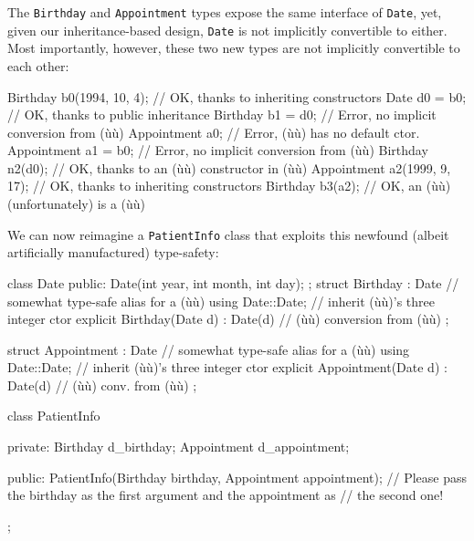 \noindent The \lstinline!Birthday! and \lstinline!Appointment! types expose the same
interface of \lstinline!Date!, yet, given our inheritance-based design,
\lstinline!Date! is not implicitly convertible to either. Most importantly,
however, these two new types are not implicitly convertible to each
other:

\begin{emcppslisting}[emcppsbatch=e5]
Birthday b0(1994, 10, 4);  // OK, thanks to inheriting constructors
Date d0 = b0;              // OK, thanks to public inheritance
Birthday b1 = d0;          // Error, no implicit conversion from (ù{}ù)
Appointment a0;            // Error, (ù{}ù) has no default ctor.
Appointment a1 = b0;       // Error, no implicit conversion from (ù{}ù)
Birthday n2(d0);           // OK, thanks to an (ù{}ù) constructor in (ù{}ù)
Appointment a2(1999, 9, 17); // OK, thanks to inheriting constructors
Birthday    b3(a2);          // OK, an (ù{}ù) (unfortunately) is a (ù{}ù)
\end{emcppslisting}

\noindent We can now reimagine a \lstinline!PatientInfo! class that exploits this
newfound (albeit artificially manufactured) type-safety:

\begin{emcppshiddenlisting}[emcppsbatch={e6,e7}]
class Date
{
public:
    Date(int year, int month, int day);
};
struct Birthday : Date  // somewhat type-safe alias for a (ù{}ù)
{
    using Date::Date;  // inherit (ù{}ù)'s three integer ctor
    explicit Birthday(Date d) : Date(d) { }  // (ù{}ù) conversion from (ù{}ù)
};

struct Appointment : Date  // somewhat type-safe alias for a (ù{}ù)
{
    using Date::Date;  // inherit (ù{}ù)'s three integer ctor
    explicit Appointment(Date d) : Date(d) { }  // (ù{}ù) conv. from (ù{}ù)
};
\end{emcppshiddenlisting}
\begin{emcppslisting}[emcppsbatch={e6,e7}]
class PatientInfo
{
private:
    Birthday d_birthday;
    Appointment d_appointment;

public:
    PatientInfo(Birthday birthday, Appointment appointment);
        // Please pass the birthday as the first argument and the appointment as
        // the second one!
};
\end{emcppslisting}

